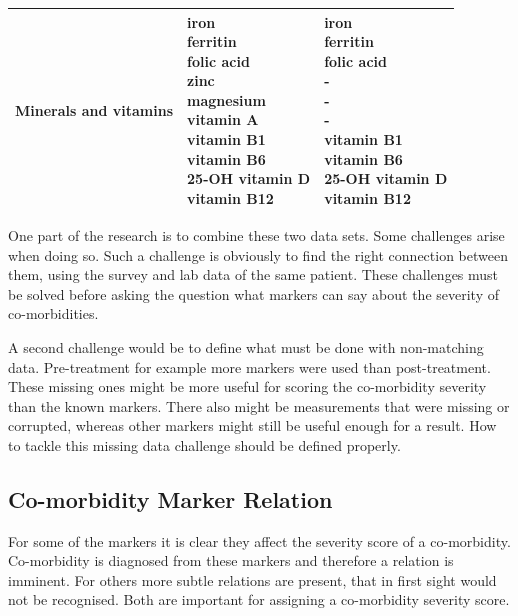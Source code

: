 \documentclass[10pt,a4paper]{report}
\begin{document}
\begin{table}
\begin{tabular}{lll}
			Minerals and vitamins & \makecell{iron\\ferritin\\folic acid\\zinc\\magnesium\\vitamin A\\vitamin B1\\vitamin B6\\25-OH vitamin D\\vitamin B12}                                        & \makecell{iron\\ferritin\\folic acid\\-\\-\\-\\vitamin B1\\vitamin B6\\25-OH vitamin D\\vitamin B12}                                                           \\ \hline
		\end{tabular}
	\end{table}
	
	One part of the research is to combine these two data sets. Some challenges arise when doing so. Such a challenge is obviously to find the right connection between them, using the survey and lab data of the same patient. These challenges must be solved before asking the question what markers can say about the severity of co-morbidities.
	
	A second challenge would be to define what must be done with non-matching data. Pre-treatment for example more markers were used than post-treatment. These missing ones might be more useful for scoring the co-morbidity severity than the known markers. There also might be measurements that were missing or corrupted, whereas other markers might still be useful enough for a result. How to tackle this missing data challenge should be defined properly.
	
	\subsection{Co-morbidity Marker Relation}
	\label{subsec:CoMorMarkRel}
	
	For some of the markers it is clear they affect the severity score of a co-morbidity. Co-morbidity is diagnosed from these markers and therefore a relation is imminent. For others more subtle relations are present, that in first sight would not be recognised. Both are important for assigning a co-morbidity severity score.
	
\end{document}
